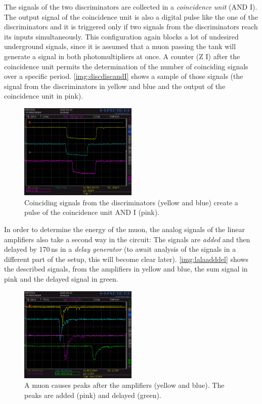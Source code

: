 The signals of the two discriminators are collected in a \emph{coincidence unit} (AND I).
The output signal of the coincidence unit is also a digital pulse like the one of the discriminators
and it is triggered only if two signals from the discriminators reach its inputs simultaneously.
This configuration again blocks a lot of undesired underground signals,
since it is assumed that a muon passing the tank will generate a signal in both photomultipliers at once.
A counter (Z I) after the coincidence unit permits the determination of the number of coinciding signals
over a specific period.
\autoref{img:discdiscandI} shows a sample of those signals
(the signal from the discriminators in yellow and blue and the output of the coincidence unit in pink).
\begin{figure}[H]
\begin{center}
  \includegraphics[width=0.5\textwidth]{../img/S0012.PNG}
  \caption{Coinciding signals from the discriminators (yellow and blue) create a pulse
  of the coincidence unit AND I (pink).}
  \label{img:discdiscandI}
\end{center}
\end{figure}
In order to determine the energy of the muon, the analog signals of the linear amplifiers
also take a second way in the circuit:
The signals are \emph{added} and then delayed by 170\,ns in a \emph{delay generator}
(to await analysis of the signals in a different part of the setup, this will become clear later).
\autoref{img:lalaadddel} shows the described signals, from the amplifiers in yellow and blue,
the sum signal in pink and the delayed signal in green.
\begin{figure}[H]
\begin{center}
  \includegraphics[width=0.5\textwidth]{../img/S0013.PNG}
  \caption{A muon causes peaks after the amplifiers (yellow and blue). The peaks are added (pink)
  and delayed (green).}
  \label{img:lalaadddel}
\end{center}
\end{figure}
